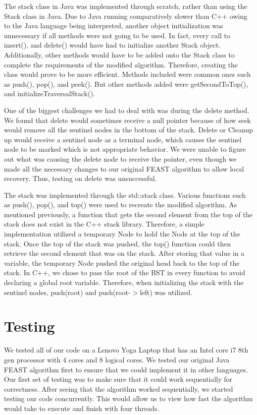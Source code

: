\documentclass[conference]{IEEEtran}
\begin{document}
The stack class in Java was implemented through scratch, rather than using the Stack class in Java. Due to Java running comparatively slower than C++ owing to the Java language being interpreted, another object initialization was unnecessary if all methods were not going to be used. In fact, every call to insert(), and delete() would have had to initialize another Stack object. Additionally, other methods would have to be added onto the Stack class to complete the requirements of the modified algorithm. Therefore, creating the class would prove to be more efficient. Methods included were common ones such as push(), pop(), and peek(). But other methods added were getSecondToTop(), and initializeTraversalStack().

One of the biggest challenges we had to deal with was during the delete method. We found that delete would sometimes receive a null pointer because of how seek would remove all the sentinel nodes in the bottom of the stack. Delete or Cleanup up would receive a sentinel node as a terminal node, which causes the sentinel node to be marked which is not appropriate behavior. We were unable to figure out what was causing the delete node to receive the pointer, even though we made all the necessary changes to our original FEAST algorithm to allow local recovery. Thus, testing on delete was unsuccessful.


The stack was implemented through the std::stack class. Various functions such as push(), pop(), and top() were used to recreate the modified algorithm. As mentioned previously, a function that gets the second element from the top of the stack does not exist in the C++ stack library. Therefore, a simple implementation utilized a temporary Node to hold the Node at the top of the stack. Once the top of the stack was pushed, the top() function could then retrieve the second element that was on the stack. After storing that value in a variable, the temporary Node pushed the original head back to the top of the stack. In C++, we chose to pass the root of the BST in every function to avoid declaring a global root variable. Therefore, when initializing the stack with the sentinel nodes, push(root) and push(root-$>$left) was utilized.

\section{Testing}
We tested all of our code on a Lenovo Yoga Laptop that has an Intel core i7 8th gen processor with 4 cores and 8 logical cores. We tested our original Java FEAST algorithm first to ensure that we could implement it in other languages. Our first set of testing was to make sure that it could work sequentially for correctness. After seeing that the algorithm worked sequentially, we started testing our code concurrently. This would allow us to view how fast the algorithm would take to execute and finish with four threads. 
\end{document}
